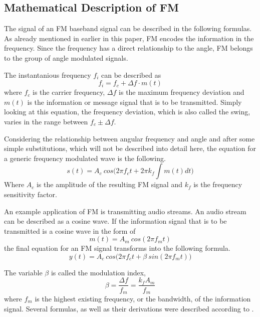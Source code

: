 \documentclass[conference]{IEEEtran}
\begin{document}
  \subsection{Mathematical Description of FM}
    The signal of an FM baseband signal can be described in the following formulas.
    As already mentioned in earlier in this paper, FM encodes the information in the frequency. 
    Since the frequency has a direct relationship to the angle, FM belongs to the group of angle modulated signals.

    The instantanious frequency $f_i$ can be described as 
    \begin{equation}
      f_i = f_c + \Delta f \cdot m(t)
    \end{equation}
    where $f_c$ is the carrier frequency, $\Delta f$ is the maximum frequency deviation and $m(t)$ is the information or message signal that is to be transmitted.
    Simply looking at this equation, the frequency deviation, which is also called the swing, varies in the range between $f_c \pm \Delta f$.

    Considering the relationship between angular frequency and angle and after some simple substitutions, which will not be described into detail here, the equation for a generic frequency modulated wave is the following.
    \begin{equation}
      s(t) = A_c\ cos \Big( 2 \pi f_c t + 2 \pi k_f \int m(t) dt \Big)
    \end{equation}
    Where $A_c$ is the amplitude of the resulting FM signal and $k_f$ is the frequency sensitivity factor.

    An example application of FM is transmitting audio streams. 
    An audio stream can be described as a cosine wave.
    If the information signal that is to be transmitted is a cosine wave in the form of 
    \begin{equation}
      m(t) = A_m\ cos(2 \pi f_m t)
    \end{equation}
    the final equation for an FM signal transforms into the following formula.
    \begin{equation}
      y(t) = A_c\ cos \Big(2 \pi f_c t + \beta\ sin(2 \pi f_m t)\Big )
    \end{equation}

    The variable $\beta$ is called the modulation index,
    \begin{equation}
      \beta = \frac{\Delta f}{f_m} = \frac{k_f A_m}{f_m}
    \end{equation}
    where $f_m$ is the highest existing frequency, or the bandwidth, of the information signal. 
    Several formulas, as well as their derivations were described according to \cite{FMMaths1}\cite{FMMaths2}.
    
\end{document}
